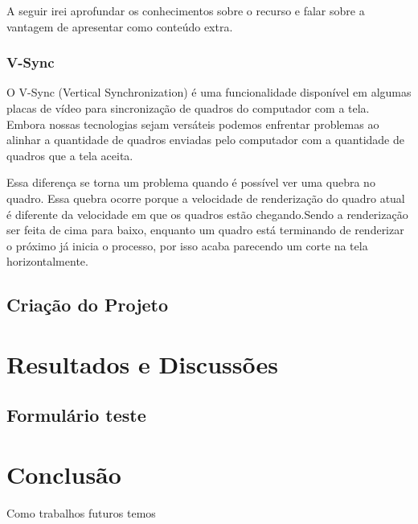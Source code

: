 \documentclass[tcc,capa]{texufpel}
\begin{document}
A seguir irei aprofundar os conhecimentos sobre o recurso e falar sobre a vantagem de apresentar como conteúdo extra.

\subsection{V-Sync}

O V-Sync (Vertical Synchronization) é uma funcionalidade disponível em algumas placas de vídeo para sincronização de quadros do computador com a tela. Embora nossas tecnologias sejam versáteis podemos enfrentar problemas ao alinhar a quantidade de quadros enviadas pelo computador com a quantidade de quadros que a tela aceita.

Essa diferença se torna um problema quando é possível ver uma quebra no quadro. Essa quebra ocorre porque a velocidade de renderização do quadro atual é diferente da velocidade em que os quadros estão chegando.Sendo a renderização ser feita de cima para baixo, enquanto um quadro está terminando de renderizar o próximo já inicia o processo, por isso acaba parecendo um corte na tela horizontalmente.



\section{Criação do Projeto}


\chapter{Resultados e Discussões}



\section{Formulário teste}

\chapter{Conclusão}

Como trabalhos futuros temos 


 




\end{document}
